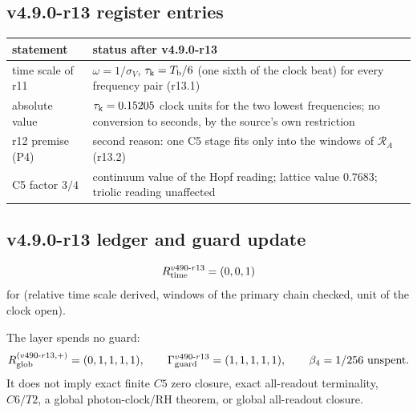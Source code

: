 \subsection*{v4.9.0-r13 register entries}
\label{subsec:v490-r13-register}

\begin{center}
\small
\begin{tabular}{@{}>{\raggedright\arraybackslash}p{}>{\raggedright\arraybackslash}p{}@{}}
\toprule
statement & status after v4.9.0-r13\\
\midrule
time scale of r11 & \(\omega=1/\sigma_V\), \(\tau_{\rm k}=T_{\rm b}/6\) (one sixth of the clock beat) for every frequency pair (r13.1)\\
absolute value & \(\tau_{\rm k}=0.15205\) clock units for the two lowest frequencies; no conversion to seconds, by the source's own restriction\\
r12 premise (P4) & second reason: one C5 stage fits only into the windows of \(\mathcal R_A\) (r13.2)\\
C5 factor \(3/4\) & continuum value of the Hopf reading; lattice value \(0.7683\); triolic reading unaffected\\
\bottomrule
\end{tabular}
\end{center}

\subsection*{v4.9.0-r13 ledger and guard update}
\label{subsec:v490-r13-ledger-guard}

\[
R_{\rm time}^{v490\text{-}r13}=(0,0,1)
\]
for (relative time scale derived, windows of the primary chain checked, unit of the clock open).

The layer spends no guard:
\[
R_{\rm glob}^{(v490\text{-}r13,+)}=(0,1,1,1,1),
\qquad
\Gamma_{\rm guard}^{v490\text{-}r13}=(1,1,1,1,1),
\qquad
\beta_4=1/256\ \text{unspent}.
\]
It does not imply exact finite \(C5\) zero closure, exact all-readout terminality,
\(C6/T2\), a global photon-clock/RH theorem, or global all-readout closure.

